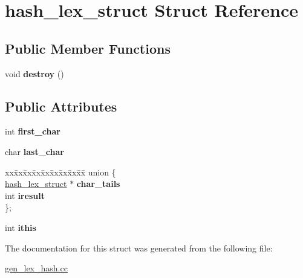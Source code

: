 \hypertarget{structhash__lex__struct}{}\section{hash\+\_\+lex\+\_\+struct Struct Reference}
\label{structhash__lex__struct}
\subsection*{Public Member Functions}
\begin{DoxyCompactItemize}
\item 
\mbox{\label{structhash__lex__struct_af09ddd467021561e0c506a4f694157ec}} 
void {\bfseries destroy} ()
\end{DoxyCompactItemize}
\subsection*{Public Attributes}
\begin{DoxyCompactItemize}
\item 
\mbox{\label{structhash__lex__struct_a2453088459bf5c1e0b3e4b04c9b4ecdf}} 
int {\bfseries first\+\_\+char}
\item 
\mbox{\label{structhash__lex__struct_ac1dd763750b80f15573ee2b3eb6e64fa}} 
char {\bfseries last\+\_\+char}
\item 
\mbox{\label{structhash__lex__struct_a9d7ca30856672d2cf86bb66917c42687}} 
\begin{tabbing}
xx\=xx\=xx\=xx\=xx\=xx\=xx\=xx\=xx\=\kill
union \{\\
\>\mbox{\hyperlink{structhash__lex__struct}{hash\_lex\_struct}} $\ast$ {\bfseries char\_tails}\\
\>int {\bfseries iresult}\\
\}; \\

\end{tabbing}\item 
\mbox{\label{structhash__lex__struct_ae70eb0438e510d2667fcd33a081f064a}} 
int {\bfseries ithis}
\end{DoxyCompactItemize}


The documentation for this struct was generated from the following file\+:\begin{DoxyCompactItemize}
\item 
\mbox{\hyperlink{gen__lex__hash_8cc}{gen\+\_\+lex\+\_\+hash.\+cc}}\end{DoxyCompactItemize}
